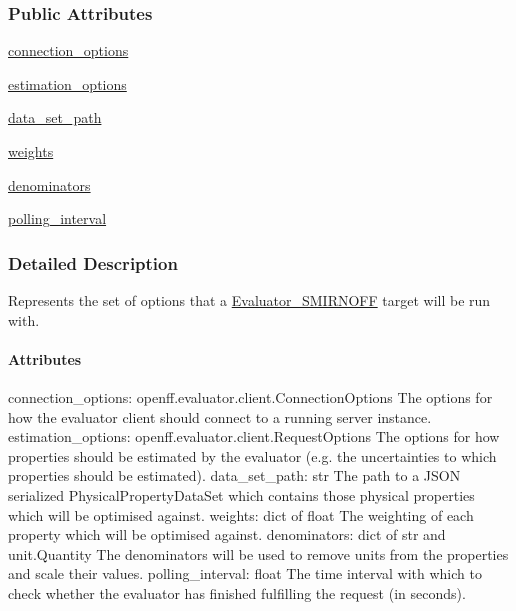\subsubsection*{Public Attributes}
\begin{DoxyCompactItemize}
\item 
\hyperlink{classsrc_1_1evaluator__io_1_1Evaluator__SMIRNOFF_1_1OptionsFile_ac13be6f72b2f4d3bc169e91841858ae0}{connection\+\_\+options}
\item 
\hyperlink{classsrc_1_1evaluator__io_1_1Evaluator__SMIRNOFF_1_1OptionsFile_a0af9d5c7fabbe9d87e0ea869b34c596f}{estimation\+\_\+options}
\item 
\hyperlink{classsrc_1_1evaluator__io_1_1Evaluator__SMIRNOFF_1_1OptionsFile_a744d421faa006be09aa04ce6afbe4276}{data\+\_\+set\+\_\+path}
\item 
\hyperlink{classsrc_1_1evaluator__io_1_1Evaluator__SMIRNOFF_1_1OptionsFile_ad5315f81d0b3d27e9da56ecabb7685f5}{weights}
\item 
\hyperlink{classsrc_1_1evaluator__io_1_1Evaluator__SMIRNOFF_1_1OptionsFile_aecb937850bc692709733b0b70b65edd6}{denominators}
\item 
\hyperlink{classsrc_1_1evaluator__io_1_1Evaluator__SMIRNOFF_1_1OptionsFile_ab59060929cea0b71aea7a1b578652ac2}{polling\+\_\+interval}
\end{DoxyCompactItemize}


\subsubsection{Detailed Description}
Represents the set of options that a {\ttfamily \hyperlink{classsrc_1_1evaluator__io_1_1Evaluator__SMIRNOFF}{Evaluator\+\_\+\+S\+M\+I\+R\+N\+O\+FF}} target will be run with. 

\paragraph*{Attributes }

connection\+\_\+options\+: openff.\+evaluator.\+client.\+Connection\+Options The options for how the {\ttfamily evaluator} client should connect to a running server instance. estimation\+\_\+options\+: openff.\+evaluator.\+client.\+Request\+Options The options for how properties should be estimated by the {\ttfamily evaluator} (e.\+g. the uncertainties to which properties should be estimated). data\+\_\+set\+\_\+path\+: str The path to a J\+S\+ON serialized Physical\+Property\+Data\+Set which contains those physical properties which will be optimised against. weights\+: dict of float The weighting of each property which will be optimised against. denominators\+: dict of str and unit.\+Quantity The denominators will be used to remove units from the properties and scale their values. polling\+\_\+interval\+: float The time interval with which to check whether the evaluator has finished fulfilling the request (in seconds). 

